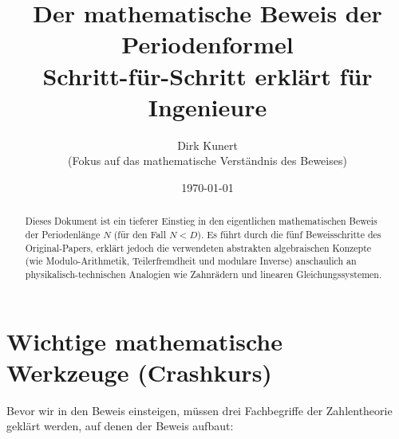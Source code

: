 \documentclass[11pt]{article}
\title{Der mathematische Beweis der Periodenformel\\ \large Schritt-für-Schritt erklärt für Ingenieure}
\author{Dirk Kunert \\ \small(Fokus auf das mathematische Verständnis des Beweises)}
\date{\today}
\begin{document}
\maketitle

\begin{abstract}
Dieses Dokument ist ein tieferer Einstieg in den eigentlichen mathematischen Beweis der Periodenlänge $N$ (für den Fall $N < D$). Es führt durch die fünf Beweisschritte des Original-Papers, erklärt jedoch die verwendeten abstrakten algebraischen Konzepte (wie Modulo-Arithmetik, Teilerfremdheit und modulare Inverse) anschaulich an physikalisch-technischen Analogien wie Zahnrädern und linearen Gleichungssystemen.
\end{abstract}

\section{Wichtige mathematische Werkzeuge (Crashkurs)}

Bevor wir in den Beweis einsteigen, müssen drei Fachbegriffe der Zahlentheorie geklärt werden, auf denen der Beweis aufbaut:
\end{document}
